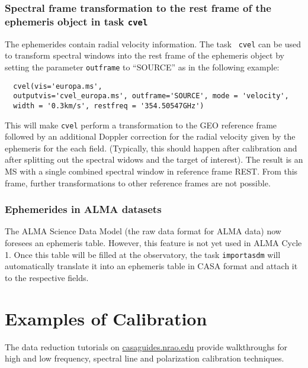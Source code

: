 \subsubsection{Spectral frame transformation to the rest frame
  of the ephemeris object in task {\tt cvel}} 

The ephemerides contain radial velocity information. The task {\tt
  cvel} can be used to transform spectral windows into the rest frame
of the ephemeris object by setting the parameter {\tt outframe} to
``SOURCE'' as in the following example:

\small
\begin{verbatim}
  cvel(vis='europa.ms',
  outputvis='cvel_europa.ms', outframe='SOURCE', mode = 'velocity',
  width = '0.3km/s', restfreq = '354.50547GHz')
\end{verbatim}
\normalsize

This will
make {\tt cvel} perform a transformation to the GEO reference frame followed
by an additional Doppler correction for the radial velocity given by
the ephemeris for the each field. (Typically, this should happen after
calibration and after splitting out the spectral widows and the target
of interest). The result is an MS with a single combined spectral
window in reference frame REST. From this frame, further
transformations to other reference frames are not possible.


\subsubsection{Ephemerides in ALMA datasets}

The ALMA Science Data
Model (the raw data format for ALMA data) now foresees an ephemeris
table. However, this feature is not yet used in ALMA Cycle 1. Once this
table will be filled at the observatory, the task {\tt importasdm} will
automatically translate it into an ephemeris table in CASA format and
attach it to the respective fields.


\section{Examples of Calibration}
\label{section:cal.examples}

The data reduction tutorials on \url{casaguides.nrao.edu} provide
walkthroughs for
high and low frequency, spectral line and polarization calibration
techniques. 


